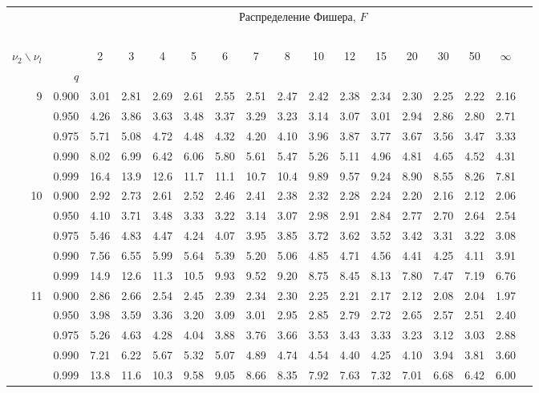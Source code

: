 \documentclass[pdftex,11pt,openany]{book}\usepackage[]{graphicx}\usepackage[]{color}
\begin{document}
{\newpage


\begin{center}
\begin{tabular}{rrr@{\,}r@{\,}r@{\,}r@{\,}r@{\,}r@{\,}r@{\,}r
                   @{\,}r@{\,}r@{\,}r@{\,}r@{\,}r@{\,}r@{\,}r}
&&\multicolumn{14}{c}{Распределение Фишера, $F$}\\
\ \\
$\nu_2\backslash\nu_l$ & & 
\multicolumn{1}{c}{2} &\multicolumn{1}{c}{3} &
\multicolumn{1}{c}{4} &\multicolumn{1}{c}{5} &
\multicolumn{1}{c}{6} &\multicolumn{1}{c}{7} &
\multicolumn{1}{c}{8} &\multicolumn{1}{c}{10}&
\multicolumn{1}{c}{12}&\multicolumn{1}{c}{15}&
\multicolumn{1}{c}{20}&\multicolumn{1}{c}{30}&
\multicolumn{1}{c}{50}&\multicolumn{1}{c}{$\infty$}\\
& $q$ \\
 9&0.900&3.01&2.81&2.69&2.61&2.55&2.51&2.47&2.42&2.38&2.34&2.30&2.25&2.22&2.16\\
  &0.950&4.26&3.86&3.63&3.48&3.37&3.29&3.23&3.14&3.07&3.01&2.94&2.86&2.80&2.71\\
  &0.975&5.71&5.08&4.72&4.48&4.32&4.20&4.10&3.96&3.87&3.77&3.67&3.56&3.47&3.33\\
  &0.990&8.02&6.99&6.42&6.06&5.80&5.61&5.47&5.26&5.11&4.96&4.81&4.65&4.52&4.31\\
  &0.999&16.4&13.9&12.6&11.7&11.1&10.7&10.4&9.89&9.57&9.24&8.90&8.55&8.26&7.81\\
10&0.900&2.92&2.73&2.61&2.52&2.46&2.41&2.38&2.32&2.28&2.24&2.20&2.16&2.12&2.06\\
  &0.950&4.10&3.71&3.48&3.33&3.22&3.14&3.07&2.98&2.91&2.84&2.77&2.70&2.64&2.54\\
  &0.975&5.46&4.83&4.47&4.24&4.07&3.95&3.85&3.72&3.62&3.52&3.42&3.31&3.22&3.08\\
  &0.990&7.56&6.55&5.99&5.64&5.39&5.20&5.06&4.85&4.71&4.56&4.41&4.25&4.11&3.91\\
  &0.999&14.9&12.6&11.3&10.5&9.93&9.52&9.20&8.75&8.45&8.13&7.80&7.47&7.19&6.76\\
11&0.900&2.86&2.66&2.54&2.45&2.39&2.34&2.30&2.25&2.21&2.17&2.12&2.08&2.04&1.97\\
  &0.950&3.98&3.59&3.36&3.20&3.09&3.01&2.95&2.85&2.79&2.72&2.65&2.57&2.51&2.40\\
  &0.975&5.26&4.63&4.28&4.04&3.88&3.76&3.66&3.53&3.43&3.33&3.23&3.12&3.03&2.88\\
  &0.990&7.21&6.22&5.67&5.32&5.07&4.89&4.74&4.54&4.40&4.25&4.10&3.94&3.81&3.60\\
  &0.999&13.8&11.6&10.3&9.58&9.05&8.66&8.35&7.92&7.63&7.32&7.01&6.68&6.42&6.00\\

\end{tabular}
\end{center}}
\end{document}

